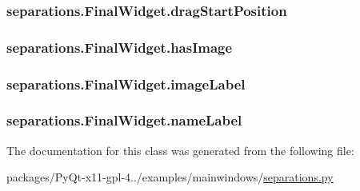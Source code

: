 \subsubsection[{drag\+Start\+Position}]{\setlength{\rightskip}{0pt plus 5cm}separations.\+Final\+Widget.\+drag\+Start\+Position}\label{classseparations_1_1FinalWidget_a66a50b6f531bdb92db71110625b71939}
\hypertarget{classseparations_1_1FinalWidget_a45d4d76e9372d9d8e154c942ab7259e6}{}
\subsubsection[{has\+Image}]{\setlength{\rightskip}{0pt plus 5cm}separations.\+Final\+Widget.\+has\+Image}\label{classseparations_1_1FinalWidget_a45d4d76e9372d9d8e154c942ab7259e6}
\hypertarget{classseparations_1_1FinalWidget_a8d2a26fc581eb0a39604f7abc9e0c2aa}{}
\subsubsection[{image\+Label}]{\setlength{\rightskip}{0pt plus 5cm}separations.\+Final\+Widget.\+image\+Label}\label{classseparations_1_1FinalWidget_a8d2a26fc581eb0a39604f7abc9e0c2aa}
\hypertarget{classseparations_1_1FinalWidget_a8fc94a74cc2519d45b01059d59c63e66}{}
\subsubsection[{name\+Label}]{\setlength{\rightskip}{0pt plus 5cm}separations.\+Final\+Widget.\+name\+Label}\label{classseparations_1_1FinalWidget_a8fc94a74cc2519d45b01059d59c63e66}


The documentation for this class was generated from the following file\+:\begin{DoxyCompactItemize}
\item 
packages/\+Py\+Qt-\/x11-\/gpl-\/4../examples/mainwindows/\hyperlink{separations_8py}{separations.\+py}\end{DoxyCompactItemize}
